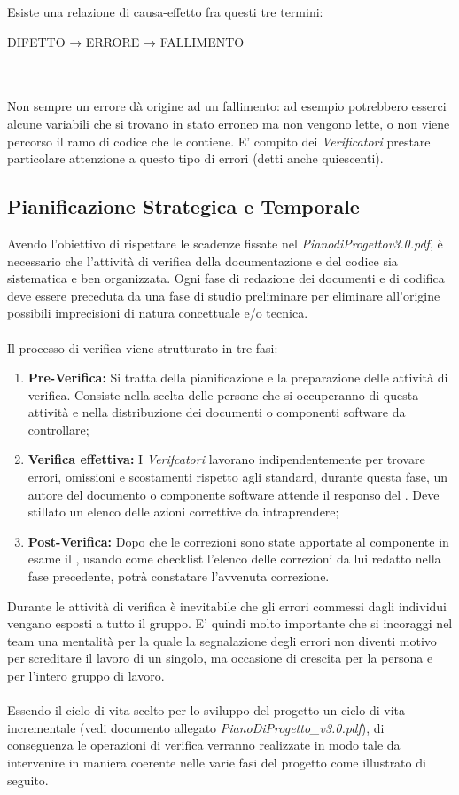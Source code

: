 Esiste una relazione di causa-effetto fra questi tre termini: \begin{center}
	DIFETTO → ERRORE → FALLIMENTO
\end{center}
\\ \\
Non sempre un errore dà origine ad un fallimento: ad esempio potrebbero esserci alcune variabili che si trovano in stato erroneo ma non vengono lette, o non viene percorso il ramo di codice che le contiene. E' compito dei \textit{Verificatori} prestare particolare attenzione a questo tipo di errori (detti anche quiescenti).

\subsection{Pianificazione Strategica e Temporale}
Avendo l'obiettivo di rispettare le scadenze fissate nel \textit{PianodiProgettov3.0.pdf}, è necessario che l'attività di verifica della documentazione e del codice sia sistematica e ben organizzata. Ogni fase di redazione dei documenti e di codifica deve essere preceduta da una fase di studio preliminare per eliminare all'origine possibili imprecisioni di natura concettuale e/o tecnica.
\\ \\Il processo di verifica viene strutturato in tre fasi:
\begin{enumerate}
	\item \textbf{Pre-Verifica:} Si tratta della pianificazione e la preparazione delle attività di verifica. Consiste nella scelta delle persone che si occuperanno di questa attività e nella distribuzione dei documenti o componenti software da controllare;
	\item \textbf{Verifica effettiva:} I \textit{Verifcatori} lavorano indipendentemente per trovare errori, omissioni e scostamenti rispetto agli standard, durante questa fase, un autore del documento o componente software attende il responso del \ruoloVerificatore. Deve stillato un elenco delle azioni correttive da intraprendere;
	\item \textbf{Post-Verifica:} Dopo che le correzioni sono state apportate al componente in esame il \ruoloVerificatore, usando  come checklist l'elenco delle correzioni da lui redatto nella fase precedente, potrà constatare l'avvenuta correzione.
\end{enumerate}
Durante le attività di verifica è inevitabile che gli errori commessi dagli individui vengano esposti a tutto il gruppo. E' quindi molto importante che si incoraggi nel team una mentalità per la quale la segnalazione degli errori non diventi motivo per screditare il lavoro di un singolo, ma occasione di crescita per la persona e per l'intero gruppo di lavoro.\\ \\
Essendo il ciclo di vita scelto per lo sviluppo del progetto un ciclo di vita incrementale (vedi documento allegato \textit{PianoDiProgetto\_v3.0.pdf}), di conseguenza le
operazioni di verifica verranno realizzate in modo tale da intervenire in maniera coerente nelle varie fasi del progetto come illustrato di seguito.


